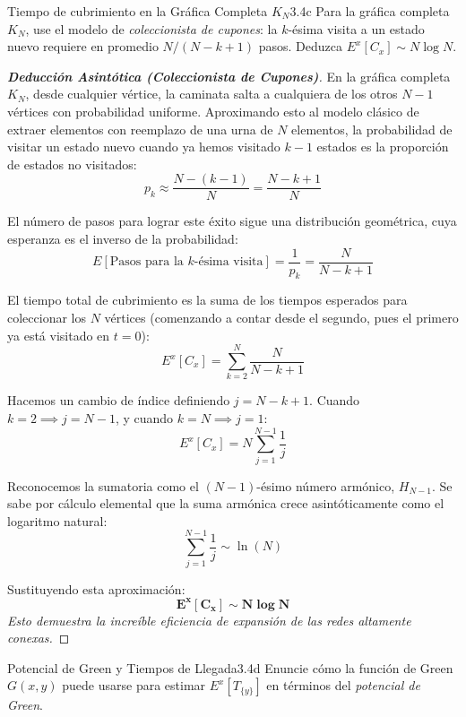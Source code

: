 \documentclass[10pt,a4paper]{article}
\begin{document}
\newpage

\begin{ejercicio}{Tiempo de cubrimiento en la Gráfica Completa $K_N$}{3.4c}
    Para la gráfica completa $K_N$, use el modelo de \textit{coleccionista de cupones}: la $k$-ésima visita a un estado nuevo requiere en promedio $N/(N-k+1)$ pasos. Deduzca $E^x[C_x] \sim N \log N$.
\end{ejercicio}

\begin{proof}[\textbf{Deducción Asintótica (Coleccionista de Cupones)}]
    En la gráfica completa $K_N$, desde cualquier vértice, la caminata salta a cualquiera de los otros $N-1$ vértices con probabilidad uniforme. 
    Aproximando esto al modelo clásico de extraer elementos con reemplazo de una urna de $N$ elementos, la probabilidad de visitar un estado nuevo cuando ya hemos visitado $k-1$ estados es la proporción de estados no visitados:
    \[ p_k \approx \frac{N - (k-1)}{N} = \frac{N - k + 1}{N} \]
    
    El número de pasos para lograr este éxito sigue una distribución geométrica, cuya esperanza es el inverso de la probabilidad:
    \[ E[\text{Pasos para la } k\text{-ésima visita}] = \frac{1}{p_k} = \frac{N}{N - k + 1} \]
    
    El tiempo total de cubrimiento es la suma de los tiempos esperados para coleccionar los $N$ vértices (comenzando a contar desde el segundo, pues el primero ya está visitado en $t=0$):
    \[ E^x[C_x] = \sum_{k=2}^N \frac{N}{N - k + 1} \]
    
    Hacemos un cambio de índice definiendo $j = N - k + 1$. Cuando $k=2 \implies j=N-1$, y cuando $k=N \implies j=1$:
    \[ E^x[C_x] = N \sum_{j=1}^{N-1} \frac{1}{j} \]
    
    Reconocemos la sumatoria como el $(N-1)$-ésimo número armónico, $H_{N-1}$. Se sabe por cálculo elemental que la suma armónica crece asintóticamente como el logaritmo natural:
    \[ \sum_{j=1}^{N-1} \frac{1}{j} \sim \ln(N) \]
    
    Sustituyendo esta aproximación:
    \[ \mathbf{E^x[C_x] \sim N \log N} \]
    \textit{Esto demuestra la increíble eficiencia de expansión de las redes altamente conexas.}
\end{proof}

\newpage

\begin{ejercicio}{Potencial de Green y Tiempos de Llegada}{3.4d}
    Enuncie cómo la función de Green $G(x,y)$ puede usarse para estimar $E^x[T_{\{y\}}]$ en términos del \textit{potencial de Green}.
\end{ejercicio}
\end{document}
